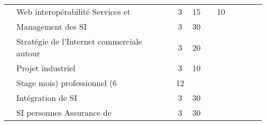 \begin{tabular}{c|m{6cm}|cm{1cm}|cm{1cm}|cm{1cm}|cm{1cm}|}
 & \color{black} \mbox{Web} \mbox{interopérabilité} \mbox{Services} \mbox{et}  & \color{black} 3 & \color{black} 15 & \color{black}  & \color{black} 10 \\ \cline{2-6}
 & \cellcolor{couleurClaire} \color{couleurTexte} \mbox{Management} \mbox{des} \mbox{SI}  & \cellcolor{couleurClaire} \color{couleurTexte} 3 & \cellcolor{couleurClaire} \color{couleurTexte} 30 & \cellcolor{couleurClaire} \color{couleurTexte}  & \cellcolor{couleurClaire} \color{couleurTexte}  \\ \cline{2-6}
 & \color{black} \mbox{Stratégie} \mbox{de} \mbox{l’Internet} \mbox{commerciale} \mbox{autour}  & \color{black} 3 & \color{black} 20 & \color{black}  & \color{black}  \\ \cline{2-6}
 & \cellcolor{couleurClaire} \color{couleurTexte} \mbox{Projet} \mbox{industriel}  & \cellcolor{couleurClaire} \color{couleurTexte} 3 & \cellcolor{couleurClaire} \color{couleurTexte} 10 & \cellcolor{couleurClaire} \color{couleurTexte}  & \cellcolor{couleurClaire} \color{couleurTexte}  \\ \cline{2-6}
 & \color{black} \mbox{Stage} \mbox{mois)} \mbox{professionnel} \mbox{(6}  & \color{black} 12 & \color{black}  & \color{black}  & \color{black}  \\ \cline{2-6}
 & \cellcolor{couleurClaire} \color{couleurTexte} \mbox{Intégration} \mbox{de} \mbox{SI}  & \cellcolor{couleurClaire} \color{couleurTexte} 3 & \cellcolor{couleurClaire} \color{couleurTexte} 30 & \cellcolor{couleurClaire} \color{couleurTexte}  & \cellcolor{couleurClaire} \color{couleurTexte}  \\ \cline{2-6}
 & \color{black} \mbox{SI} \mbox{personnes} \mbox{Assurance} \mbox{de}  & \color{black} 3 & \color{black} 30 & \color{black}  & \color{black}  \\ \cline{2-6}
\hline
\end{tabular}
